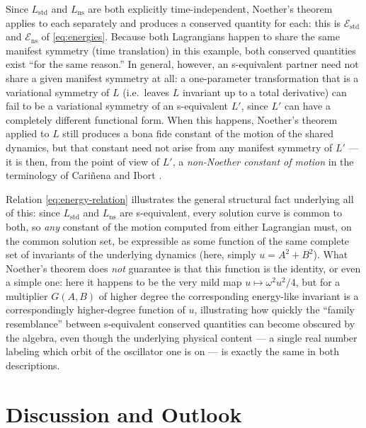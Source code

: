 \documentclass[11pt]{article}
\theoremstyle{remark}
\begin{document}
Since $L_{\mathrm{std}}$ and $L_{\mathrm{ns}}$ are both explicitly time-independent, Noether's theorem applies to each separately and produces a conserved quantity for each: this is $\mathcal E_{\mathrm{std}}$ and $\mathcal E_{\mathrm{ns}}$ of \eqref{eq:energies}. Because both Lagrangians happen to share the same manifest symmetry (time translation) in this example, both conserved quantities exist ``for the same reason.'' In general, however, an s-equivalent partner need not share a given manifest symmetry at all: a one-parameter transformation that is a variational symmetry of $L$ (i.e.\ leaves $L$ invariant up to a total derivative) can fail to be a variational symmetry of an s-equivalent $L'$, since $L'$ can have a completely different functional form. When this happens, Noether's theorem applied to $L$ still produces a bona fide constant of the motion of the shared dynamics, but that constant need not arise from any manifest symmetry of $L'$ --- it is then, from the point of view of $L'$, a \emph{non-Noether constant of motion} in the terminology of Cariñena and Ibort \cite{CarinenaIbort1983}.

Relation \eqref{eq:energy-relation} illustrates the general structural fact underlying all of this: since $L_{\mathrm{std}}$ and $L_{\mathrm{ns}}$ are s-equivalent, every solution curve is common to both, so \emph{any} constant of the motion computed from either Lagrangian must, on the common solution set, be expressible as some function of the same complete set of invariants of the underlying dynamics (here, simply $u=A^2+B^2$). What Noether's theorem does \emph{not} guarantee is that this function is the identity, or even a simple one: here it happens to be the very mild map $u\mapsto \omega^2u^2/4$, but for a multiplier $G(A,B)$ of higher degree the corresponding energy-like invariant is a correspondingly higher-degree function of $u$, illustrating how quickly the ``family resemblance'' between s-equivalent conserved quantities can become obscured by the algebra, even though the underlying physical content --- a single real number labeling which orbit of the oscillator one is on --- is exactly the same in both descriptions.

\section{Discussion and Outlook}
\end{document}
